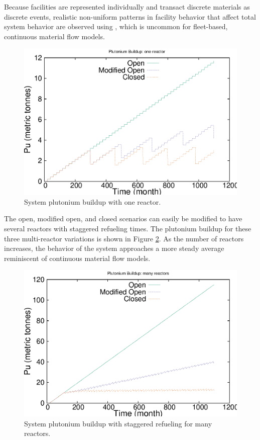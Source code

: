 Because facilities are represented individually and
transact discrete materials as discrete events, realistic non-uniform patterns in facility behavior
that affect total system behavior are observed using \Cyclus, which is uncommon 
for fleet-based, continuous material flow models.

\begin{figure}[H]
\begin{center}
\includegraphics{./images/puseries-1.eps}
\end{center}
\caption{System plutonium buildup with one reactor.}
\label{fig:puseries1}
\end{figure}

The open, modified open, and closed scenarios can easily be modified to have
several reactors with staggered refueling times. The plutonium buildup
for these three multi-reactor variations is shown in Figure
\ref{fig:puseriesn}. As the number of
reactors increases, the behavior of the system approaches a more steady
average reminiscent of continuous material flow models.

\begin{figure}[H]
\begin{center}
\includegraphics{./images/puseries-n.eps}
\end{center}
\caption{System plutonium buildup with staggered refueling for many reactors.}
\label{fig:puseriesn}
\end{figure}

